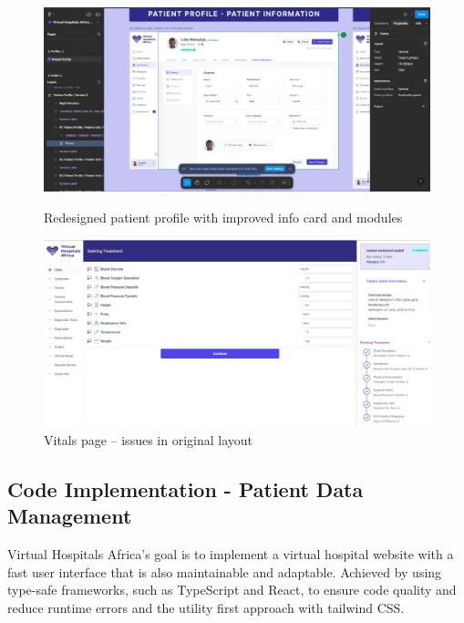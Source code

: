 \begin{figure}[H]
    \centering
    \begin{minipage}{0.47\textwidth}
        \centering
        \includegraphics[width=\textwidth]{images/(VHA)-5.jpg}
        \caption{Redesigned patient profile with improved info card and modules}
        \label{fig:desbign-5}
    \end{minipage}\hfill
    \begin{minipage}{0.47\textwidth}
        \centering
        \includegraphics[width=\textwidth]{images/(VHA)-6.jpg}
        \caption{Vitals page – issues in original layout}
        \label{fig:design-6}
    \end{minipage}
\end{figure}

\subsection{Code Implementation - Patient Data Management}

Virtual Hospitals Africa's goal is to implement a virtual hospital website with a fast user interface that is also maintainable and adaptable. Achieved by using type-safe frameworks, such as TypeScript and React, to ensure code quality and reduce runtime errors and the utility first approach with tailwind CSS.

